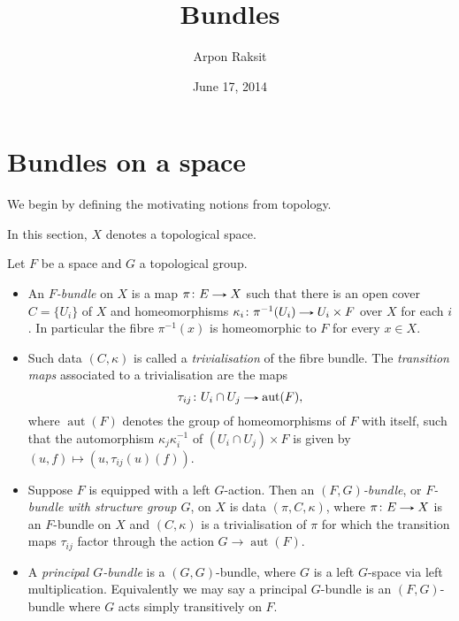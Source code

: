 


\newcommand{\aut}{\operatorname{aut}}
\newcommand{\saut}{\operatorname{\underline{aut}}}
\newcommand{\Bun}{\operatorname{Bun}}
\renewcommand{\E}{\mathcal{E}}
\renewcommand{\F}{\mathcal{F}}
\renewcommand{\G}{\mathcal{G}}
\renewcommand{\H}{\mathcal{H}}
\renewcommand{\X}{\mathcal{X}}
\renewcommand{\Y}{\mathcal{Y}}


\title{Bundles}
\author{Arpon Raksit}
\date{June 17, 2014}


\maketitle


\section{Bundles on a space}

We begin by defining the motivating notions from topology.

\begin{notation}
  In this section, $X$ denotes a topological space.
\end{notation}

\begin{definitions}
  \label{fibre-bundle}
  Let $F$ be a space and $G$ a topological group.
  \begin{itemize}
  \item An \emph{$F$-bundle} on $X$ is a map $\pi \c E \to X$ such
    that there is an open cover $C = \{U_i\}$ of $X$ and
    homeomorphisms $\kappa_i \c \pi^{-1}(U_i) \to U_i \times F$ over
    $X$ for each $i$. In particular the fibre $\pi^{-1}(x)$ is
    homeomorphic to $F$ for every $x \in X$.
  \item Such data $(C,\kappa)$ is called a \emph{trivialisation} of
    the fibre bundle. The \emph{transition maps} associated to a
    trivialisation are the maps
    \[
    \tau_{ij} \c U_i \cap U_j \to \aut(F),
    \]
    where $\aut(F)$ denotes the group of homeomorphisms of $F$ with
    itself, such that the automorphism $\kappa_j\kappa_i^{-1}$ of
    $(U_i \cap U_j) \times F$ is given by $(u,f) \mapsto (u,
    \tau_{ij}(u)(f))$.
  \item Suppose $F$ is equipped with a left $G$-action. Then an
    \emph{$(F,G)$-bundle}, or \emph{$F$-bundle with structure group
      $G$}, on $X$ is data $(\pi,C,\kappa)$, where $\pi \c E \to X$ is
    an $F$-bundle on $X$ and $(C,\kappa)$ is a trivialisation of $\pi$
    for which the transition maps $\tau_{ij}$ factor through the
    action $G \to \aut(F)$.
  \item A \emph{principal $G$-bundle} is a $(G,G)$-bundle, where $G$
    is a left $G$-space via left multiplication. Equivalently we may
    say a principal $G$-bundle is an $(F,G)$-bundle where $G$ acts
    simply transitively on $F$.
  \end{itemize}
\end{definitions}

